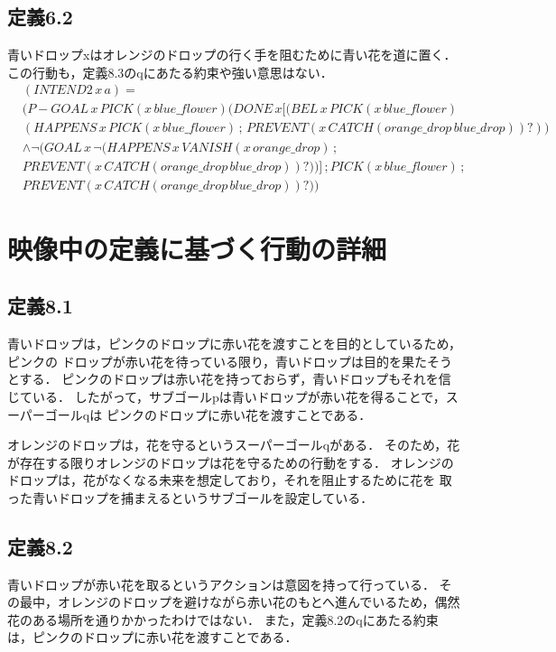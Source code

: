 \documentclass[a4]{jsarticle}
\begin{document}
\subsection{定義6.2}
青いドロップxはオレンジのドロップの行く手を阻むために青い花を道に置く．
この行動も，定義8.3のqにあたる約束や強い意思はない．
\begin{align*}
	&(INTEND2 \, x \, a) = \\
	&(P-GOAL \, x \, PICK(x \, blue\_flower) (DONE \, x [(BEL \, x \, PICK(x \, blue\_flower) \\
	&(HAPPENS \, x \, PICK(x \, blue\_flower) \, ; \, PREVENT(x \, CATCH(orange\_drop \, blue\_drop))?)) \\
	&\land \neg(GOAL \, x \, \neg(HAPPENS \, x \, VANISH(x \, orange\_drop) \, ; \,\\
	&PREVENT(x \, CATCH(orange\_drop \, blue\_drop))?))] \, ; PICK(x \, blue\_flower) \, ; \\
	&PREVENT(x \, CATCH(orange\_drop \, blue\_drop))?))
\end{align*}

\section{映像中の定義に基づく行動の詳細}
\subsection{定義8.1}
青いドロップは，ピンクのドロップに赤い花を渡すことを目的としているため，ピンクの
ドロップが赤い花を待っている限り，青いドロップは目的を果たそうとする．
ピンクのドロップは赤い花を持っておらず，青いドロップもそれを信じている．
したがって，サブゴールpは青いドロップが赤い花を得ることで，スーパーゴールqは
ピンクのドロップに赤い花を渡すことである．

オレンジのドロップは，花を守るというスーパーゴールqがある．
そのため，花が存在する限りオレンジのドロップは花を守るための行動をする．
オレンジのドロップは，花がなくなる未来を想定しており，それを阻止するために花を
取った青いドロップを捕まえるというサブゴールを設定している．

\subsection{定義8.2}
青いドロップが赤い花を取るというアクションは意図を持って行っている．
その最中，オレンジのドロップを避けながら赤い花のもとへ進んでいるため，偶然
花のある場所を通りかかったわけではない．
また，定義8.2のqにあたる約束は，ピンクのドロップに赤い花を渡すことである．
\end{document}
